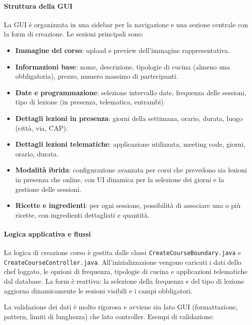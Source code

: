 \paragraph{Struttura della GUI}
La GUI è organizzata in una sidebar per la navigazione e una sezione centrale con la form di creazione. Le sezioni principali sono:
\begin{itemize}
    \item \textbf{Immagine del corso}: upload e preview dell'immagine rappresentativa.
    \item \textbf{Informazioni base}: nome, descrizione, tipologie di cucina (almeno una obbligatoria), prezzo, numero massimo di partecipanti.
    \item \textbf{Date e programmazione}: selezione intervallo date, frequenza delle sessioni, tipo di lezione (in presenza, telematica, entrambi).
    \item \textbf{Dettagli lezioni in presenza}: giorni della settimana, orario, durata, luogo (città, via, CAP).
    \item \textbf{Dettagli lezioni telematiche}: applicazione utilizzata, meeting code, giorni, orario, durata.
    \item \textbf{Modalità ibrida}: configurazione avanzata per corsi che prevedono sia lezioni in presenza che online, con UI dinamica per la selezione dei giorni e la gestione delle sessioni.
    \item \textbf{Ricette e ingredienti}: per ogni sessione, possibilità di associare una o più ricette, con ingredienti dettagliati e quantità.
\end{itemize}

\paragraph{Logica applicativa e flussi}
La logica di creazione corso è gestita dalle classi \texttt{CreateCourseBoundary.java} e \texttt{CreateCourseController.java}. All'inizializzazione vengono caricati i dati dello chef loggato, le opzioni di frequenza, tipologie di cucina e applicazioni telematiche dal database. La form è reattiva: la selezione della frequenza e del tipo di lezione aggiorna dinamicamente le sezioni visibili e i campi obbligatori.

La validazione dei dati è molto rigorosa e avviene sia lato GUI (formattazione, pattern, limiti di lunghezza) che lato controller. Esempi di validazione:

